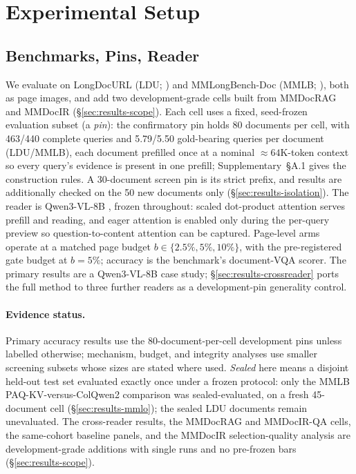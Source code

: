 \documentclass[letterpaper]{article} %
\newcommand{\paqc}{\textsc{PAQ-KV}}
\begin{document}
\section{Experimental Setup}\label{sec:setup}

\subsection{Benchmarks, Pins, Reader}
We evaluate on LongDocURL (LDU; \citealp{deng2025longdocurl}) and MMLongBench-Doc (MMLB; \citealp{ma2024mmlongbench}), both as page images, and add two development-grade
cells built from MMDocRAG \citep{dong2025mmdocrag} and MMDocIR
\citep{dong2025mmdocir} (\S\ref{sec:results-scope}). Each cell uses a fixed,
seed-frozen evaluation subset (a \emph{pin}): the confirmatory pin holds 80
documents per cell, with 463/440 complete queries and 5.79/5.50 gold-bearing
queries per document (LDU/MMLB), each document prefilled
once at a nominal ${\approx}64$K-token context so every query's evidence is
present in one prefill; Supplementary~\S A.1 gives the
construction rules. A 30-document screen pin is its strict prefix, and
results are additionally checked on the 50 new documents only
(\S\ref{sec:results-isolation}). The reader is Qwen3-VL-8B
\citep{qwen3vl2025}, frozen throughout: scaled dot-product attention serves
prefill and reading, and eager attention is enabled only during the per-query
preview so question-to-content attention can be captured. Page-level arms
operate at a matched page budget $b \in \{2.5\%, 5\%, 10\%\}$, with the
pre-registered gate budget at $b=5\%$; accuracy is the benchmark's
document-VQA scorer. The primary results are a Qwen3-VL-8B case study;
\S\ref{sec:results-crossreader} ports the full method to three further
readers as a development-pin generality control.

\paragraph{Evidence status.} Primary accuracy results use the
80-document-per-cell development pins unless labelled otherwise; mechanism,
budget, and integrity analyses use smaller screening subsets whose sizes are
stated where used. \emph{Sealed} here means a disjoint held-out test set
evaluated exactly once under a frozen protocol: only the MMLB
\paqc{}-versus-ColQwen2 comparison was sealed-evaluated, on a fresh
45-document cell (\S\ref{sec:results-mmlo}); the sealed LDU documents
remain unevaluated. The cross-reader results, the MMDocRAG and MMDocIR-QA
cells, the same-cohort baseline panels, and the MMDocIR selection-quality
analysis are development-grade additions with single runs and no pre-frozen
bars (\S\ref{sec:results-scope}).
\end{document}
